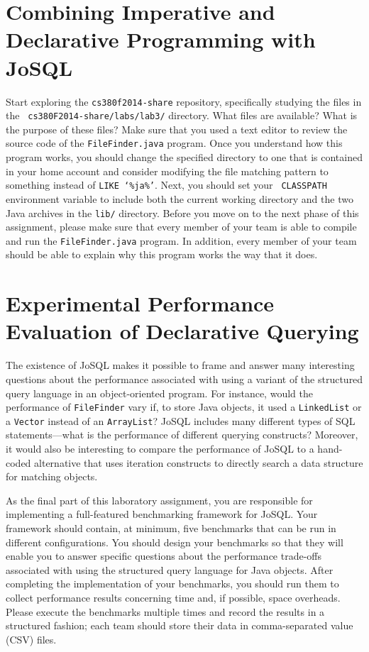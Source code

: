 \section*{Combining Imperative and Declarative Programming with JoSQL}

\begin{sloppypar}

  Start exploring the {\tt cs380f2014-share} repository, specifically studying the files in the {\tt
    cs380F2014-share/labs/lab3/} directory. What files are available? What is the purpose of these files? Make sure that
  you used a text editor to review the source code of the {\tt FileFinder.java} program. Once you understand how this
  program works, you should change the specified directory to one that is contained in your home account and consider
  modifying the file matching pattern to something instead of {\tt LIKE `\%ja\%'}. Next, you should set your {\tt
    CLASSPATH} environment variable to include both the current working directory and the two Java archives in the {\tt lib/}
  directory. Before you move on to the next phase of this assignment, please make sure that every member of your team is
  able to compile and run the {\tt FileFinder.java} program. In addition, every member of your team should be able to
  explain why this program works the way that it does.

\end{sloppypar}

\section*{Experimental Performance Evaluation of Declarative Querying}
\vspace*{-.2in}


The existence of JoSQL makes it possible to frame and answer many interesting questions about the performance associated
with using a variant of the structured query language in an object-oriented program.  For instance, would the
performance of {\tt FileFinder} vary if, to store Java objects, it used a {\tt LinkedList} or a {\tt Vector} instead of
an {\tt ArrayList}?  JoSQL includes many different types of SQL statements---what is the performance of different
querying constructs?  Moreover, it would also be interesting to compare the performance of JoSQL to a hand-coded
alternative that uses iteration constructs to directly search a data structure for matching objects.

As the final part of this laboratory assignment, you are responsible for implementing a full-featured benchmarking framework
for JoSQL.  Your framework should contain, at minimum, five benchmarks that can be run in different configurations.  You
should design your benchmarks so that they will enable you to answer specific questions about the performance trade-offs
associated with using the structured query language for Java objects.  After completing the implementation of your
benchmarks, you should run them to collect performance results concerning time and, if possible, space overheads.
Please execute the benchmarks multiple times and record the results in a structured fashion; each team should
store their data in comma-separated value (CSV) files.

